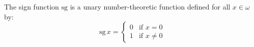 The sign function $\text{sg}$ is a unary number-theoretic function defined for all $x \in \omega$ by:
$$\text{sg}\, x = \begin{cases} 0 & \text{if } x = 0 \\ 1 & \text{if } x \neq 0 \end{cases}$$
